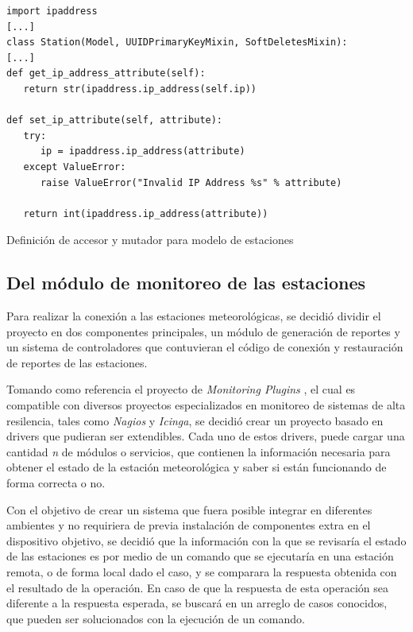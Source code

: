 \begin{listing}
\begin{verbatim}
import ipaddress
[...]
class Station(Model, UUIDPrimaryKeyMixin, SoftDeletesMixin):
[...]
def get_ip_address_attribute(self):
   return str(ipaddress.ip_address(self.ip))

def set_ip_attribute(self, attribute):
   try:
      ip = ipaddress.ip_address(attribute)
   except ValueError:
      raise ValueError("Invalid IP Address %s" % attribute)

   return int(ipaddress.ip_address(attribute))
\end{verbatim}
\caption{Definición de accesor y mutador para modelo de estaciones}
\label{lst:model-station-mutator}
\end{listing}

\subsection{Del módulo de monitoreo de las estaciones}

Para realizar la conexión a las estaciones meteorológicas, se decidió dividir el proyecto en dos componentes principales, un módulo de generación de reportes y un sistema de controladores que contuvieran el código de conexión y restauración de reportes de las estaciones.

Tomando como referencia el proyecto de \textit{Monitoring Plugins} \cite{monitoring_plugins}, el cual es compatible con diversos proyectos especializados en monitoreo de sistemas de alta resilencia, tales como \textit{Nagios} y \textit{Icinga}, se decidió crear un proyecto basado en drivers que pudieran ser extendibles. Cada uno de estos drivers, puede cargar una cantidad \textit{n} de módulos o servicios, que contienen la información necesaria para obtener el estado de la estación meteorológica y saber si están funcionando de forma correcta o no.

Con el objetivo de crear un sistema que fuera posible integrar en diferentes ambientes y no requiriera de previa instalación de componentes extra en el dispositivo objetivo, se decidió que la información con la que se revisaría el estado de las estaciones es por medio de un comando que se ejecutaría en una estación remota, o de forma local dado el caso, y se comparara la respuesta obtenida con el resultado de la operación. En caso de que la respuesta de esta operación sea diferente a la respuesta esperada, se buscará en un arreglo de casos conocidos, que pueden ser solucionados con la ejecución de un comando.

